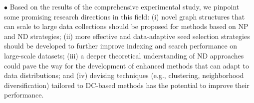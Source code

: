 

\noindent$\bullet$ Based on the results of the comprehensive experimental study, we pinpoint some promising research directions in this field: 
(i) novel graph structures that can scale to large data collections should be proposed for methods based on NP and ND strategies;
(ii) more effective and data-adaptive seed selection strategies should be developed to further improve indexing and search performance on large-scale datasets; 
(iii) a deeper theoretical understanding of ND approaches could pave the way for the development of enhanced methods that can adapt to data distributions; and 
(iv) devising techniques (e.g., clustering, neighborhood diversification) tailored to DC-based methods has the potential to improve their performance. 


